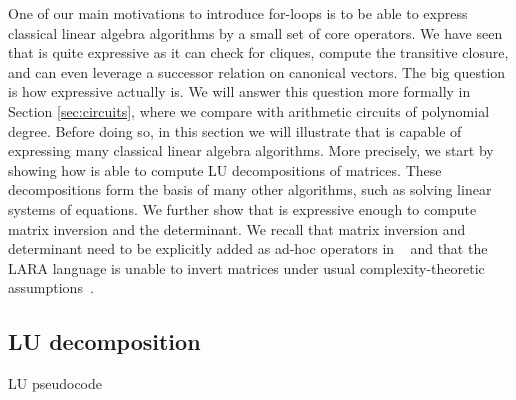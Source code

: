 
One of our main motivations to introduce for-loops is to be able to express classical linear algebra algorithms by a small set of core operators. We have seen that \langfor is
quite expressive as it can check for cliques, compute the transitive closure, and can even
leverage a successor relation on canonical vectors. The big question is how expressive \langfor
actually is. We will answer this question more formally in Section \ref{sec:circuits}, where we compare \langfor with 
arithmetic circuits of polynomial degree.
Before doing so, in this section we will illustrate that \langfor is capable of expressing many classical linear algebra algorithms. More precisely, we start by showing how  \langfor is able to
compute LU decompositions of matrices. These decompositions form the basis of many other algorithms, such as solving linear systems of equations. We further show that \langfor is expressive enough to compute matrix inversion and the determinant. We recall that matrix inversion and determinant need to be explicitly added as ad-hoc operators in \lang~\cite{matlang-journal} and that the LARA language is unable to invert matrices under usual complexity-theoretic assumptions~\cite{BarceloH0S20}.


\subsection{LU decomposition}

\begin{algorithm}[t]
    \caption{LU pseudocode}
    \label{alg:lu}
    \begin{algorithmic}[1]
            \EndFor
        \EndFunction
        \State{ }
            \EndFor
        \EndFunction
        \State{ }
            \EndFor
            \State{}
            \State{}
        \EndFunction
    \end{algorithmic}
\end{algorithm}


